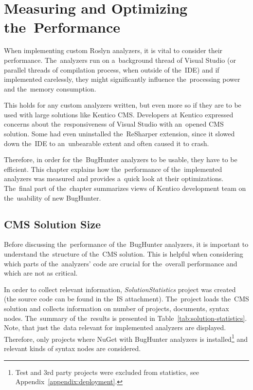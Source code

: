 \documentclass[
  digital, %
  table,   %
  lof,     %
  lot,     %
  oneside,
]{fithesis3}
\begin{document}
\chapter{Measuring and Optimizing the~Performance}
\label{chap:performance}
When implementing custom Roslyn analyzers, it is vital to consider their performance. The~analyzers run on a~background thread of Visual Studio (or parallel threads of compilation process, when outside of the~IDE) and if implemented carelessly, they might significantly influence the~processing power and the~memory consumption.

This holds for any custom analyzers written, but even more so if they are to be used with large solutions like Kentico CMS. Developers at Kentico expressed concerns about the~responsiveness of Visual Studio with an~opened CMS solution. Some had even uninstalled the~ReSharper extension, since it slowed down the~IDE to an~unbearable extent and often caused it to crash. 

Therefore, in order for the~BugHunter analyzers to be usable, they have to be efficient. This chapter explains how the~performance of the~implemented analyzers was measured and provides a~quick look at their optimizations. The~final part of the~chapter summarizes views of Kentico development team on the~usability of new BugHunter.

\section{CMS Solution Size}
Before discussing the~performance of the~BugHunter analyzers, it is important to understand the~structure of the~CMS solution. This is helpful when considering which parts of the~analyzers' code are crucial for the~overall performance and which are not as critical.

In order to collect relevant information, \textit{SolutionStatistics} project was created (the source code can be found in the~IS attachment). The~project loads the~CMS solution and collects information on number of projects, documents, syntax nodes. The~summary of the~results is presented in Table~\ref{tab:solution-statistics}. Note, that just the~data relevant for implemented analyzers are displayed. Therefore, only projects where NuGet with BugHunter analyzers is installed\footnote{Test and 3rd party projects were excluded from statistics, see Appendix~\ref{appendix:deployment}.} and relevant kinds of syntax nodes are considered.
\end{document}
